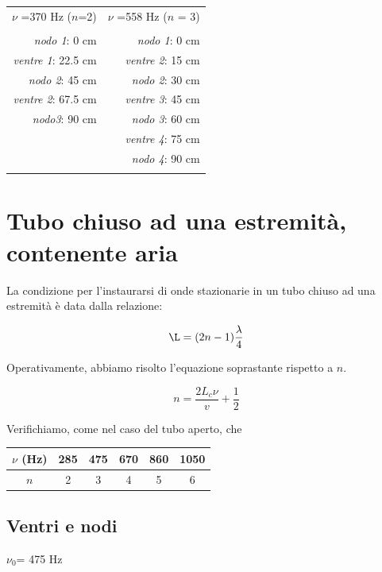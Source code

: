 \documentclass[a4paper,10pt]{report}
\begin{document}
\begin{center}
\begin{tabular}{r  r}

$\nu$ =370 Hz ($n$=2) & $\nu$ =558 Hz ($n$ = 3)\\
\\
\textit{nodo 1}: 0 cm & \textit{nodo 1}:  0 cm\\
\textit{ventre 1}: 22.5 cm & \textit{ventre 2}: 15 cm\\
\textit{nodo 2}: 45 cm &\textit{nodo 2}: 30 cm\\
\textit{ventre 2}: 67.5 cm&\textit{ventre 3}: 45 cm\\
\textit{nodo3}: 90 cm & \textit{nodo 3}: 60 cm\\
&\textit{ventre 4}: 75 cm\\
&\textit{nodo 4}: 90 cm\\
\\

\end{tabular}
\end{center}

 
\section{Tubo chiuso ad una estremità, contenente aria}

La condizione per l'instaurarsi di onde stazionarie in un tubo chiuso ad una estremità è data dalla relazione:

\begin{equation}
\L=(2n-1)\frac{\lambda}{4}
\end{equation}

Operativamente, abbiamo risolto l'equazione soprastante rispetto a $n$.

$$ n = \frac{2L_c\nu}{v} + \frac{1}{2} $$

Verifichiamo, come nel caso del tubo aperto, che 

\begin{center}
\begin{tabular}{c|c|c|c|c|c}
$\nu$ (Hz) & 285 & 475 & 670 & 860 & 1050 \\
\midrule
$n$ & 2 & 3 & 4 & 5 & 6 \\
\end{tabular}
\end{center}

\subsection{Ventri e nodi}
$\nu_0$= 475 Hz\\
\end{document}

